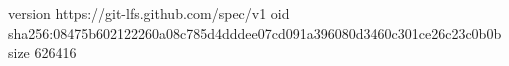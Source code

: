 version https://git-lfs.github.com/spec/v1
oid sha256:08475b602122260a08c785d4dddee07cd091a396080d3460c301ce26c23c0b0b
size 626416

